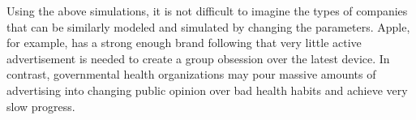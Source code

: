 Using the above simulations, it is not difficult to imagine the types of companies that can be similarly modeled and simulated by changing the parameters. Apple, for example, has a strong enough brand following that very little active advertisement is needed to create a group obsession over the latest device. In contrast, governmental health organizations may pour massive amounts of advertising into changing public opinion over bad health habits and achieve very slow progress.